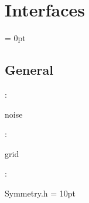 
\section{Interfaces} 


\parskip = 0pt

\vspace{3mm} \subsection*{General}

: 

noise
\vspace{2mm}

: 

grid
\vspace{2mm}

\vspace{5mm}

: 

Symmetry.h
\vspace{2mm}\parskip = 10pt 
